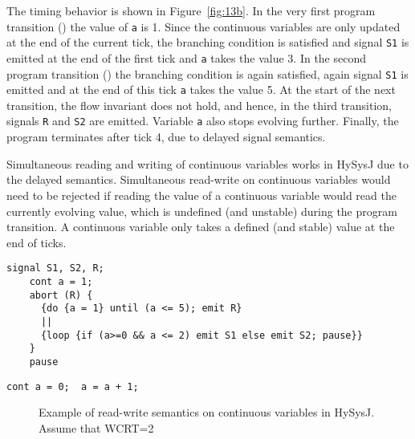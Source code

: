 \documentclass[10pt,journal,cspaper,compsoc]{IEEEtran}
\begin{document}
The timing behavior is shown in Figure~\ref{fig:13b}. In the very first
program transition () the value of \texttt{a} is 1. Since the
continuous variables are only updated at the end of the current tick,
the branching condition is satisfied and signal \texttt{S1} is emitted
at the end of the first tick and \texttt{a} takes the value 3. In the
second program transition () the branching condition is again
satisfied, again signal \texttt{S1} is emitted and at the end of this
tick \texttt{a} takes the value 5. At the start of the next transition,
the flow invariant does not hold, and hence, in the third transition,
signals \texttt{R} and \texttt{S2} are emitted. Variable \texttt{a} also
stops evolving further. Finally, the program terminates after tick 4,
due to delayed signal semantics.

Simultaneous reading and writing of continuous variables works in HySysJ
due to the delayed semantics. Simultaneous read-write on continuous
variables would need to be rejected if reading the value of a continuous
variable would read the currently evolving value, which is undefined
(and unstable) during the program transition. A continuous variable only
takes a defined (and stable) value at the end of ticks.

\newbox{\iecf}
\begin{lrbox}{\iecf}
  \begin{lstlisting}[mathescape,style=sysj,morekeywords={until,cont,signal,loop,abort,await,emit,present,trap,pause,exit,delay,suspend}]
    signal S1, S2, R;
    cont a = 1;
    abort (R) {
      {do {a = 1} until (a <= 5); emit R} 
      || 
      {loop {if (a>=0 && a <= 2) emit S1 else emit S2; pause}}
    }
    pause
  \end{lstlisting}
\end{lrbox}

\newbox{\iecs}
\begin{lrbox}{\iecs}
  \begin{lstlisting}[mathescape,style=sysj,morekeywords={until,cont,signal,loop,abort,await,emit,present,trap,pause,exit,delay,suspend}]
    cont a = 0;  a = a + 1;
  \end{lstlisting}
\end{lrbox}

\begin{figure}[t!]
  \centering {}

  \caption{Example of read-write semantics on continuous variables in
    HySysJ. Assume that WCRT=2}
  \label{fig:13}
\end{figure}
\end{document}
